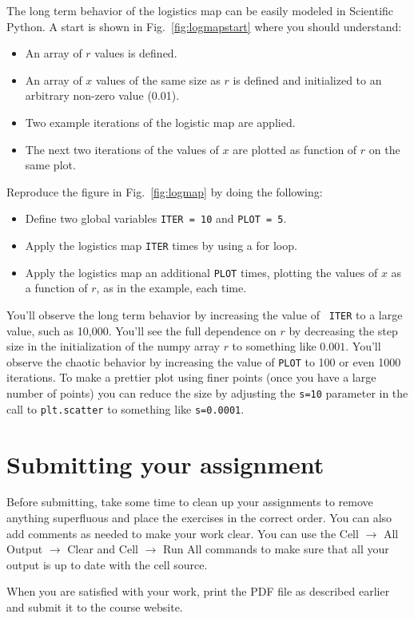 The long term behavior of the logistics map can be easily modeled in
Scientific Python.  A start is shown in Fig.~\ref{fig:logmapstart}
where you should understand:
\begin{itemize}
\item An array of $r$ values is defined.
\item An array of $x$ values of the same size as $r$ is defined and initialized to an arbitrary non-zero value (0.01).
\item Two example iterations of the logistic map are applied.
\item The next two iterations of the values of $x$ are plotted as function of $r$ on the same plot.
\end{itemize}

\noindent
\begin{plot} \end{plot} Reproduce the figure in Fig.~\ref{fig:logmap} by doing the following:
\begin{itemize}
\item Define two global variables {\tt ITER = 10} and {\tt PLOT = 5}.
\item Apply the logistics map {\tt ITER} times by using a for loop.
\item Apply the logistics map an additional {\tt PLOT} times, plotting the values of $x$ as a function of $r$, as in the example, each time.
\end{itemize}
You'll observe the long term behavior by increasing the value of {\tt
  ITER} to a large value, such as 10,000.  You'll see the full
dependence on $r$ by decreasing the step size in the initialization of
the numpy array $r$ to something like $0.001$.  You'll observe the
chaotic behavior by increasing the value of {\tt PLOT} to 100 or even
1000 iterations.  To make a prettier plot using finer points (once you
have a large number of points) you can reduce the size by adjusting
the {\tt s=10} parameter in the call to {\tt plt.scatter} to something
like {\tt s=0.0001}.

\section{Submitting your assignment}

Before submitting, take some time to clean up your assignments to
remove anything superfluous and place the exercises in the correct
order.  You can also add comments as needed to make your work clear.
You can use the Cell $\to$ All Output $\to$ Clear and Cell $\to$ Run
All commands to make sure that all your output is up to date with the
cell source.

When you are satisfied with your work, print the PDF file as described
earlier and submit it to the course website.

